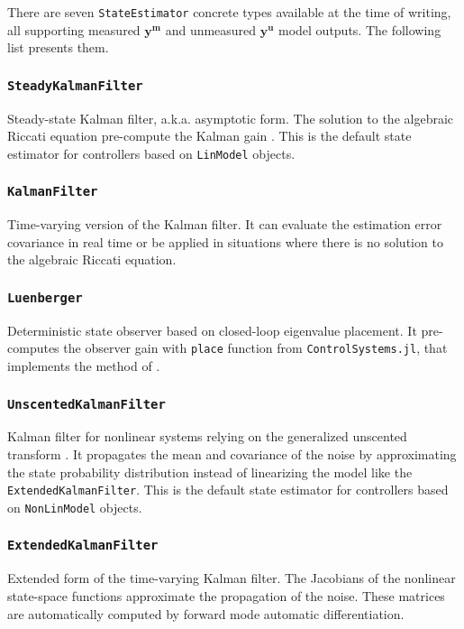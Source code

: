 There are seven \texttt{StateEstimator} concrete types available at the time of writing, all supporting measured $\mathbf{y^m}$ and unmeasured $\mathbf{y^u}$ model outputs. The following list presents them.

\subsubsection{\textnormal{\texttt{SteadyKalmanFilter}}}
Steady-state Kalman filter, a.k.a. asymptotic form. The solution to the algebraic Riccati equation pre-compute the Kalman gain \citep{simon}. This is the default state estimator for controllers based on \texttt{LinModel} objects.

\subsubsection{\textnormal{\texttt{KalmanFilter}}}
Time-varying version of the Kalman filter. It can evaluate the estimation error covariance in real time or be applied in situations where there is no solution to the algebraic Riccati equation.

\subsubsection{\textnormal{\texttt{Luenberger}}}
Deterministic state observer based on closed-loop eigenvalue placement. It pre-computes the observer gain with \texttt{place} function from \texttt{ControlSystems.jl}, that implements the method of \citet{placePoles}.

\subsubsection{\textnormal{\texttt{UnscentedKalmanFilter}}}
Kalman filter for nonlinear systems relying on the generalized unscented transform \citep{simon}. It propagates the mean and covariance of the noise by approximating the state probability distribution instead of linearizing the model like the \texttt{ExtendedKalmanFilter}. This is the default state estimator for controllers based on \texttt{NonLinModel} objects.

\subsubsection{\textnormal{\texttt{ExtendedKalmanFilter}}}
Extended form of the time-varying Kalman filter. The Jacobians of the nonlinear state-space functions approximate the propagation of the noise. These matrices are automatically computed by forward mode automatic differentiation.

